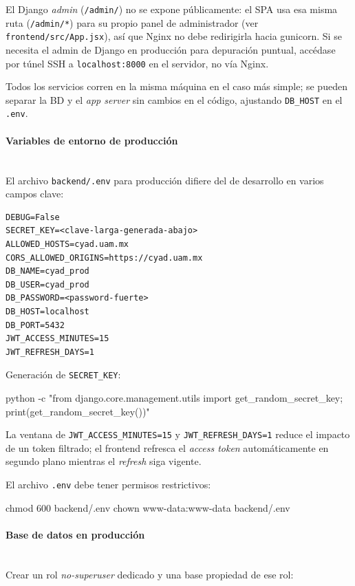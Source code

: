 El Django \emph{admin} (\texttt{/admin/}) no se expone públicamente: el SPA usa esa misma ruta (\texttt{/admin/*}) para su propio panel de administrador (ver \texttt{frontend/src/App.jsx}), así que Nginx no debe redirigirla hacia gunicorn. Si se necesita el admin de Django en producción para depuración puntual, accédase por túnel SSH a \texttt{localhost:8000} en el servidor, no vía Nginx.

Todos los servicios corren en la misma máquina en el caso más simple; se pueden separar la BD y el \emph{app server} sin cambios en el código, ajustando \texttt{DB\_HOST} en el \texttt{.env}.

\paragraph{Variables de entorno de producción}\mbox{}\\
El archivo \texttt{backend/.env} para producción difiere del de desarrollo en varios campos clave:

\begin{lstlisting}[language=DotEnv]
DEBUG=False
SECRET_KEY=<clave-larga-generada-abajo>
ALLOWED_HOSTS=cyad.uam.mx
CORS_ALLOWED_ORIGINS=https://cyad.uam.mx
DB_NAME=cyad_prod
DB_USER=cyad_prod
DB_PASSWORD=<password-fuerte>
DB_HOST=localhost
DB_PORT=5432
JWT_ACCESS_MINUTES=15
JWT_REFRESH_DAYS=1
\end{lstlisting}

Generación de \texttt{SECRET\_KEY}:

\begin{Comandos}
python -c "from django.core.management.utils import get_random_secret_key; print(get_random_secret_key())"
\end{Comandos}

La ventana de \texttt{JWT\_ACCESS\_MINUTES=15} y \texttt{JWT\_REFRESH\_DAYS=1} reduce el impacto de un token filtrado; el frontend refresca el \emph{access token} automáticamente en segundo plano mientras el \emph{refresh} siga vigente.

El archivo \texttt{.env} debe tener permisos restrictivos:

\begin{Comandos}
chmod 600 backend/.env
chown www-data:www-data backend/.env
\end{Comandos}

\paragraph{Base de datos en producción}\mbox{}\\
Crear un rol \emph{no-superuser} dedicado y una base propiedad de ese rol:

